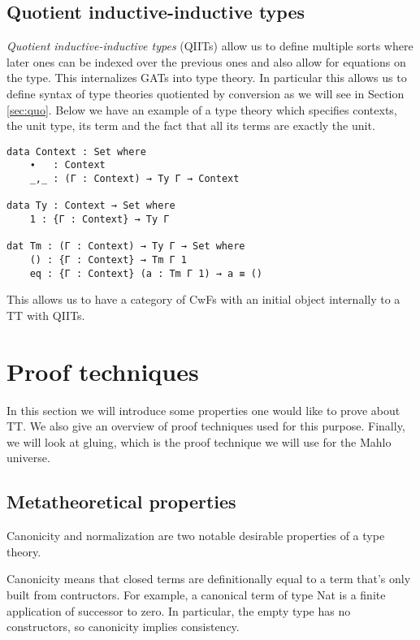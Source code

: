 \newpage

\subsection{Quotient inductive-inductive types}

\emph{Quotient inductive-inductive types} (QIITs) \cite{altenkirch2018quotient, kaposi2019constructing} allow us to define multiple sorts where later ones can be indexed over the previous ones and also allow for equations on the type. This internalizes GATs into type theory. In particular this allows us to define syntax of type theories quotiented by conversion as we will see in Section \ref{sec:quo}. Below we have an example of a type theory which specifies contexts, the unit type, its term and the fact that all its terms are exactly the unit.

\begin{verbatim}
data Context : Set where
    ∙   : Context
    _,_ : (Γ : Context) → Ty Γ → Context

data Ty : Context → Set where
    1 : {Γ : Context} → Ty Γ

dat Tm : (Γ : Context) → Ty Γ → Set where
    () : {Γ : Context} → Tm Γ 1
    eq : {Γ : Context} (a : Tm Γ 1) → a ≡ ()
\end{verbatim}

This allows us to have a category of CwFs with an initial object internally to a TT with QIITs.

\section{Proof techniques}

In this section we will introduce some properties one would like to prove about TT. We also give an overview of proof techniques used for this purpose. Finally, we will look at gluing, which is the proof technique we will use for the Mahlo universe.

\subsection{Metatheoretical properties}

Canonicity and normalization are two notable desirable properties of a type theory.

Canonicity means that closed terms are definitionally equal to a term that's only built from contructors. For example, a canonical term of type Nat is a finite application of successor to zero. In particular, the empty type has no constructors, so canonicity implies consistency.

